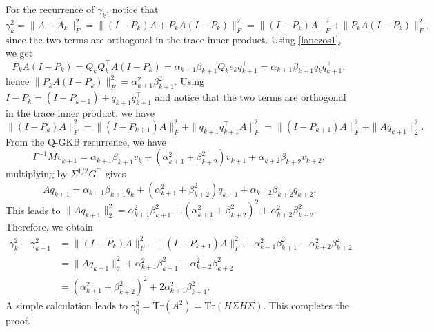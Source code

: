 \documentclass[]{myarticle}
\begin{document}
\begin{proofof}{}
For the recurrence of $\gamma_k$, notice that 
\begin{equation*}
  \gamma_k^2=\|A-\widehat A_k\|_F^2 = \|(I-P_k)A+P_kA(I-P_k)\|_{F}^2 = \|(I-P_k)A\|_{F}^2 + \|P_kA(I-P_k)\|_F^2,
\end{equation*}
since the two terms are orthogonal in the trace inner product. Using \cref{lanczos1}, we get 
\begin{equation*}
  P_kA(I-P_k) = Q_kQ_k^\top A(I-P_k) = \alpha_{k+1}\beta_{k+1}Q_ke_kq_{k+1}^\top = \alpha_{k+1}\beta_{k+1}q_kq_{k+1}^\top,
\end{equation*}
hence $\|P_kA(I-P_k)\|_F^2=\alpha_{k+1}^2\beta_{k+1}^2$. Using $I-P_k=(I-P_{k+1})+q_{k+1}q_{k+1}^\top$ and notice that the two terms are orthogonal in the trace inner product, we have 
\begin{equation*}
  \|(I-P_k)A\|_{F}^2 =  \|(I-P_{k+1})A\|_{F}^2 + \|q_{k+1}q_{k+1}^\top A\|_F^2
  = \|(I-P_{k+1})A\|_{F}^2 + \|Aq_{k+1}\|_2^2.
\end{equation*}
From the Q-GKB recurrence, we have 
\[\Gamma^{-1}Mv_{k+1} = \alpha_{k+1}\beta_{k+1}v_k + (\alpha_{k+1}^2+\beta_{k+2}^2)v_{k+1} + \alpha_{k+2}\beta_{k+2}v_{k+2}, \]
multiplying by $\Sigma^{1/2}G^\top$ gives
\[Aq_{k+1} = \alpha_{k+1}\beta_{k+1}q_k + (\alpha_{k+1}^2+\beta_{k+2}^2)q_{k+1} + \alpha_{k+2}\beta_{k+2}q_{k+2}. \]
This leads to $\|Aq_{k+1}\|_2^2=\alpha_{k+1}^2\beta_{k+1}^2+(\alpha_{k+1}^2+\beta_{k+2}^2)^2+\alpha_{k+2}^2\beta_{k+2}^2.$
Therefore, we obtain
\begin{align*}
  \gamma_{k}^2-\gamma_{k+1}^2 
  &= \|(I-P_k)A\|_{F}^2-\|(I-P_{k+1})A\|_{F}^2 + \alpha_{k+1}^2\beta_{k+1}^2 - \alpha_{k+2}^2\beta_{k+2}^2 \\
  &= \|Aq_{k+1}\|_2^2 + \alpha_{k+1}^2\beta_{k+1}^2 - \alpha_{k+2}^2\beta_{k+2}^2 \\
  &= (\alpha_{k+1}^2+\beta_{k+2}^2)^2 + 2\alpha_{k+1}^2\beta_{k+1}^2.
\end{align*}
A simple calculation leads to $\gamma_{0}^2=\mathrm{Tr}(A^2)=\mathrm{Tr}(H\Sigma H\Sigma)$. This completes the proof.
\end{proofof}
\end{document}
